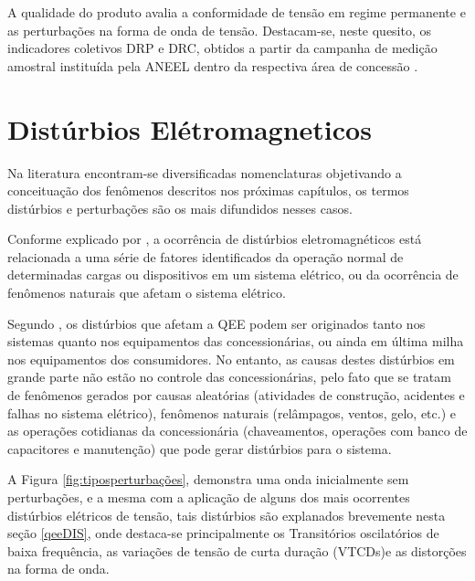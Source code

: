 \par 
A qualidade do produto avalia a conformidade de tensão em regime permanente e as perturbações na forma de onda de tensão. Destacam-se, neste quesito, os indicadores coletivos DRP e DRC, obtidos a partir da campanha de medição amostral instituída pela ANEEL dentro da respectiva área de concessão \cite{ANEE2}.

\section{Distúrbios Elétromagneticos}\label{dis}
\par 
Na literatura encontram-se diversificadas nomenclaturas objetivando a conceituação dos fenômenos descritos nos próximas capítulos, os termos distúrbios e perturbações são os mais difundidos nesses casos. 
\par 
Conforme explicado por \cite{FER99}, a ocorrência de distúrbios eletromagnéticos está relacionada a uma série de fatores identificados da operação normal de determinadas cargas ou dispositivos em um sistema elétrico, ou da ocorrência de fenômenos naturais que afetam o sistema elétrico.
\par 
Segundo \cite{JUN09}, os distúrbios que afetam a QEE podem ser originados tanto nos sistemas quanto nos equipamentos das concessionárias, ou ainda em última milha nos equipamentos dos consumidores. No entanto, as causas destes distúrbios em grande parte não estão no controle das concessionárias, pelo fato que se tratam de fenômenos gerados por causas aleatórias  (atividades de construção, acidentes e falhas no sistema elétrico), fenômenos naturais (relâmpagos, ventos, gelo, etc.) e as operações cotidianas da concessionária (chaveamentos, operações com banco de capacitores e manutenção) que pode gerar distúrbios para o sistema.
\par 
A Figura \ref{fig:tiposperturbações}, demonstra uma onda inicialmente sem perturbações, e a mesma com a aplicação de alguns dos mais ocorrentes distúrbios elétricos de tensão, tais distúrbios são explanados brevemente nesta seção \ref{qeeDIS}, onde destaca-se principalmente os Transitórios oscilatórios de baixa frequência, as variações de tensão de curta duração (VTCDs)e as distorções na forma de onda.

